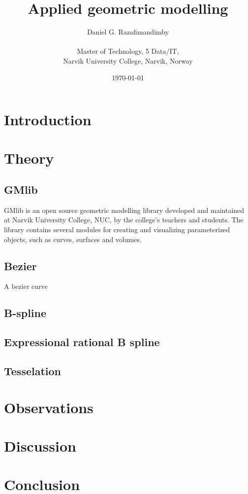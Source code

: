 \documentclass[a4paper,11pt]{article}
\title{Applied geometric modelling}
\author{
  Daniel G. Razafimandimby \\ \\
  Master of Technology, 5 Data/IT, \\
  Narvik University College, Narvik, Norway
}
\date{\today}
\begin{document}
\maketitle

\begin{abstract}

\end{abstract}


\section{Introduction}

\section{Theory}
\subsection{GMlib}
GMlib is an open source geometric modelling library developed and maintained at Narvik University College, NUC, 
by the college's teachers and students. The library contains several modules for creating and visualizing parameterized 
objects, such as curves, surfaces and volumes. 
\subsection{Bezier}
A bezier curve 
\subsection{B-spline}
\subsection{Expressional rational B spline}
\subsection{Tesselation}

\section{Observations}

\section{Discussion}

\section{Conclusion}

%
%
\end{document}
